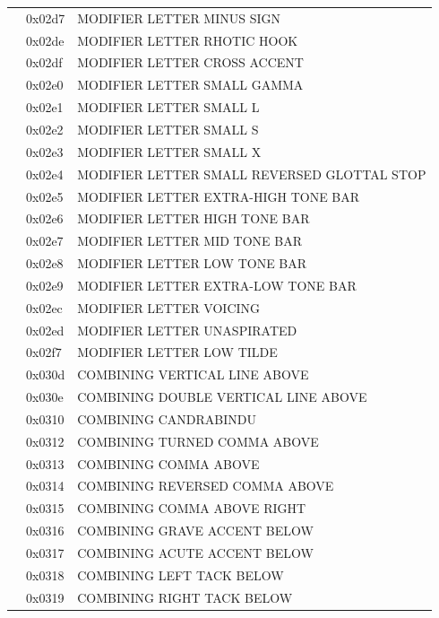 \documentclass[12pt, twoside]{article}
\begin{document}
\begin{longtable}{L{1.0cm} L{2.0cm} >{\footnotesize}L{10cm}}
&0x02d7&MODIFIER LETTER MINUS SIGN\\
&0x02de&MODIFIER LETTER RHOTIC HOOK\\
&0x02df&MODIFIER LETTER CROSS ACCENT\\
&0x02e0&MODIFIER LETTER SMALL GAMMA\\
&0x02e1&MODIFIER LETTER SMALL L\\
&0x02e2&MODIFIER LETTER SMALL S\\
&0x02e3&MODIFIER LETTER SMALL X\\
&0x02e4&MODIFIER LETTER SMALL REVERSED GLOTTAL STOP\\
&0x02e5&MODIFIER LETTER EXTRA-HIGH TONE BAR\\
&0x02e6&MODIFIER LETTER HIGH TONE BAR\\
&0x02e7&MODIFIER LETTER MID TONE BAR\\
&0x02e8&MODIFIER LETTER LOW TONE BAR\\
&0x02e9&MODIFIER LETTER EXTRA-LOW TONE BAR\\
&0x02ec&MODIFIER LETTER VOICING\\
&0x02ed&MODIFIER LETTER UNASPIRATED\\
&0x02f7&MODIFIER LETTER LOW TILDE\\
&0x030d&COMBINING VERTICAL LINE ABOVE\\
&0x030e&COMBINING DOUBLE VERTICAL LINE ABOVE\\
&0x0310&COMBINING CANDRABINDU\\
&0x0312&COMBINING TURNED COMMA ABOVE\\
&0x0313&COMBINING COMMA ABOVE\\
&0x0314&COMBINING REVERSED COMMA ABOVE\\
&0x0315&COMBINING COMMA ABOVE RIGHT\\
&0x0316&COMBINING GRAVE ACCENT BELOW\\
&0x0317&COMBINING ACUTE ACCENT BELOW\\
&0x0318&COMBINING LEFT TACK BELOW\\
&0x0319&COMBINING RIGHT TACK BELOW\\

\end{longtable}
\end{document}
